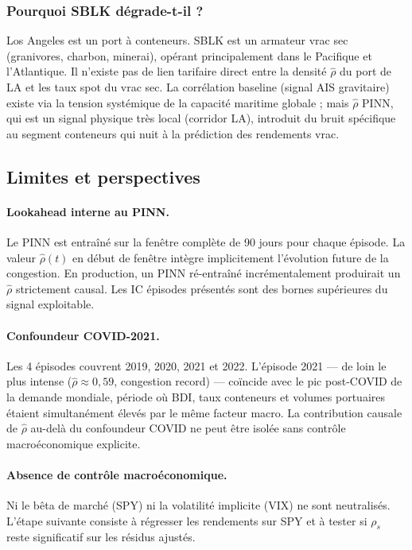 \subsubsection{Pourquoi SBLK dégrade-t-il ?}

Los Angeles est un port à conteneurs. SBLK est un armateur vrac sec
(granivores, charbon, minerai), opérant principalement dans le Pacifique
et l'Atlantique. Il n'existe pas de lien tarifaire direct entre la densité
$\hat{\rho}$ du port de LA et les taux spot du vrac sec. La corrélation
baseline (signal AIS gravitaire) existe via la tension systémique de la
capacité maritime globale ; mais $\hat{\rho}$ PINN, qui est un signal
physique très local (corridor LA), introduit du bruit spécifique au segment
conteneurs qui nuit à la prédiction des rendements vrac.

\bigskip

\subsection{Limites et perspectives}

\paragraph{Lookahead interne au PINN.}
Le PINN est entraîné sur la fenêtre complète de 90 jours pour chaque épisode.
La valeur $\hat{\rho}(t)$ en début de fenêtre intègre implicitement
l'évolution future de la congestion. En production, un PINN ré-entraîné
incrémentalement produirait un $\hat{\rho}$ strictement causal. Les IC
épisodes présentés sont des bornes supérieures du signal exploitable.

\paragraph{Confoundeur COVID-2021.}
Les 4 épisodes couvrent 2019, 2020, 2021 et 2022. L'épisode 2021 --- de loin
le plus intense ($\hat{\rho} \approx 0{,}59$, congestion record) ---
coïncide avec le pic post-COVID de la demande mondiale, période où BDI,
taux conteneurs et volumes portuaires étaient simultanément élevés par le
même facteur macro. La contribution causale de $\hat{\rho}$ au-delà du
confoundeur COVID ne peut être isolée sans contrôle macroéconomique explicite.

\paragraph{Absence de contrôle macroéconomique.}
Ni le bêta de marché (SPY) ni la volatilité implicite (VIX) ne sont
neutralisés. L'étape suivante consiste à régresser les rendements sur SPY
et à tester si $\rho_s$ reste significatif sur les résidus ajustés.


